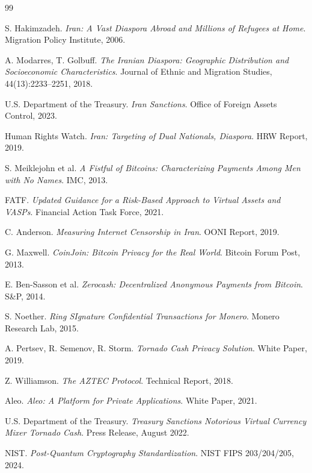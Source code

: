 \documentclass[11pt,a4paper,twocolumn]{article}
\begin{document}

\begin{thebibliography}{99}

S. Hakimzadeh. \emph{Iran: A Vast Diaspora Abroad and Millions of Refugees at Home}. Migration Policy Institute, 2006.

A. Modarres, T. Golbuff. \emph{The Iranian Diaspora: Geographic Distribution and Socioeconomic Characteristics}. Journal of Ethnic and Migration Studies, 44(13):2233--2251, 2018.

U.S. Department of the Treasury. \emph{Iran Sanctions}. Office of Foreign Assets Control, 2023.

Human Rights Watch. \emph{Iran: Targeting of Dual Nationals, Diaspora}. HRW Report, 2019.

S. Meiklejohn et al. \emph{A Fistful of Bitcoins: Characterizing Payments Among Men with No Names}. IMC, 2013.

FATF. \emph{Updated Guidance for a Risk-Based Approach to Virtual Assets and VASPs}. Financial Action Task Force, 2021.

C. Anderson. \emph{Measuring Internet Censorship in Iran}. OONI Report, 2019.

G. Maxwell. \emph{CoinJoin: Bitcoin Privacy for the Real World}. Bitcoin Forum Post, 2013.

E. Ben-Sasson et al. \emph{Zerocash: Decentralized Anonymous Payments from Bitcoin}. S\&P, 2014.

S. Noether. \emph{Ring SIgnature Confidential Transactions for Monero}. Monero Research Lab, 2015.

A. Pertsev, R. Semenov, R. Storm. \emph{Tornado Cash Privacy Solution}. White Paper, 2019.

Z. Williamson. \emph{The AZTEC Protocol}. Technical Report, 2018.

Aleo. \emph{Aleo: A Platform for Private Applications}. White Paper, 2021.

U.S. Department of the Treasury. \emph{Treasury Sanctions Notorious Virtual Currency Mixer Tornado Cash}. Press Release, August 2022.

NIST. \emph{Post-Quantum Cryptography Standardization}. NIST FIPS 203/204/205, 2024.


\end{thebibliography}
\end{document}
